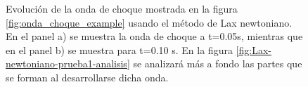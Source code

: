 \documentclass[12pt,a4paper]{book}
\begin{document}
\begin{figure}[H]
\centering
{}
\caption{\label{fig:Lax-newtoniano_sedov-3-5}Evolución de la onda de choque mostrada en la figura \ref{fig:onda_choque_example} usando el método de Lax newtoniano. En el panel a) se muestra la onda de choque a t=0.05s, mientras que en el panel b) se muestra para t=0.10 s. En la figura \ref{fig:Lax-newtoniano-prueba1-analisis} se analizará más a fondo las partes que se forman al desarrollarse dicha onda.}
\end{figure}
\end{document}
